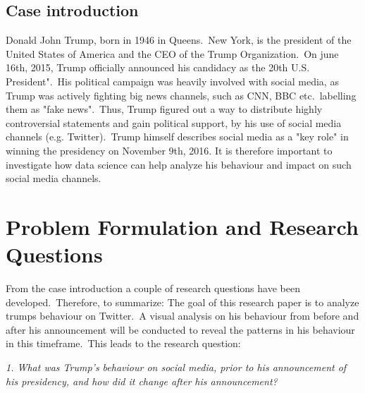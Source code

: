 \documentclass[12pt]{article}
\begin{document}
\subsection{Case introduction}
Donald John Trump, born in 1946 in Queens.\ New York, is the president of the United States of America and the CEO of the Trump Organization.\ On june 16th, 2015, Trump officially announced his candidacy as the 20th U.S. President".\ His political campaign was heavily involved with social media, as Trump was actively fighting big news channels, such as CNN, BBC etc.\ labelling them as "fake news".\ Thus, Trump figured out a way to distribute highly controversial statements and gain political support, by his use of social media channels (e.g. Twitter).\ Trump himself describes social media as a "key role" in winning the presidency on November 9th, 2016. It is therefore important to investigate how data science can help analyze his behaviour and impact on such social media channels.\





\section{Problem Formulation and Research Questions} \label{sec:ch1}
From the case introduction a couple of research questions have been developed.\ Therefore, to summarize:  The goal of this research paper is to analyze  trumps behaviour on Twitter.\  A visual analysis on his behaviour from before and after his announcement will be conducted to reveal the patterns in his behaviour in this timeframe.\ This leads to the research question: 






\par\vspace{10pt}

\textit{1. What was Trump's behaviour on social media, prior to his announcement of his presidency, and how did it change after his announcement?}\\
\end{document}
